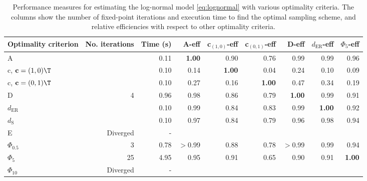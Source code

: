 \begin{table}[htb!]
\centering
\caption{Performance measures for estimating the log-normal model \eqref{eq:lognormal} with various optimality criteria. The columns show the number of fixed-point iterations and execution time to find the optimal sampling scheme, and relative efficiencies with respect to other optimality criteria.} 
\label{tab:baseline_impact_speed}
\begin{tabular}{lrrrrrrrr}
 Optimality criterion & No. iterations & Time (s) & A-eff & c$_{(1,0)}$-eff & c$_{(0,1)}$-eff & D-eff & $d_{\mathrm{ER}}$-eff & $\Phi_5$-eff \\ 
  \hline
A &  & 0.11 & \textbf{1.00} & 0.90 & 0.76 & 0.99 & 0.99 & 0.96 \\ 
  c, $\mathbf{c} = (1,0)\T$ &  & 0.10 & 0.14 & \textbf{1.00} & 0.04 & 0.24 & 0.10 & 0.09 \\ 
  c, $\mathbf{c} = (0,1)\T$ &  & 0.10 & 0.27 & 0.16 & \textbf{1.00} & 0.47 & 0.34 & 0.19 \\ 
  D & 4 & 0.96 & 0.98 & 0.86 & 0.79 & \textbf{1.00} & 0.99 & 0.91 \\ 
  $d_{\mathrm{ER}}$ &  & 0.10 & 0.99 & 0.84 & 0.83 & 0.99 & \textbf{1.00} & 0.92 \\ 
  $d_{\mathrm{S}}$ &  & 0.10 & 0.97 & 0.84 & 0.79 & 0.96 & 0.98 & 0.94 \\ 
  E & Diverged & - &  &  &  &  &  &  \\ 
  $\Phi_{0.5}$ & 3 & 0.78 & $>$0.99 & 0.88 & 0.78 & $>$0.99 & 0.99 & 0.94 \\ 
  $\Phi_5$ & 25 & 4.95 & 0.95 & 0.91 & 0.65 & 0.90 & 0.91 & \textbf{1.00} \\ 
  $\Phi_{10}$ & Diverged & - &  &  &  &  &  &  \\ 
   \hline
\end{tabular}
\end{table}
